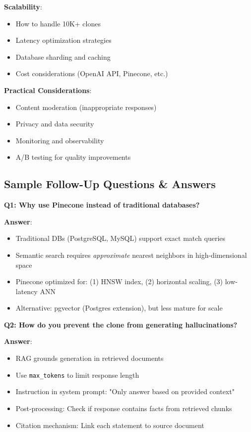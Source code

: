 \documentclass[10pt]{article}
\begin{document}
\textbf{Scalability}:
\begin{itemize}[leftmargin=*]
    \item How to handle 10K+ clones
    \item Latency optimization strategies
    \item Database sharding and caching
    \item Cost considerations (OpenAI API, Pinecone, etc.)
\end{itemize}

\textbf{Practical Considerations}:
\begin{itemize}[leftmargin=*]
    \item Content moderation (inappropriate responses)
    \item Privacy and data security
    \item Monitoring and observability
    \item A/B testing for quality improvements
\end{itemize}

\subsection{Sample Follow-Up Questions \& Answers}

\textbf{Q1: Why use Pinecone instead of traditional databases?}

\textbf{Answer}:
\begin{itemize}[leftmargin=*]
    \item Traditional DBs (PostgreSQL, MySQL) support exact match queries
    \item Semantic search requires \textit{approximate} nearest neighbors in high-dimensional space
    \item Pinecone optimized for: (1) HNSW index, (2) horizontal scaling, (3) low-latency ANN
    \item Alternative: pgvector (Postgres extension), but less mature for scale
\end{itemize}

\textbf{Q2: How do you prevent the clone from generating hallucinations?}

\textbf{Answer}:
\begin{itemize}[leftmargin=*]
    \item RAG grounds generation in retrieved documents
    \item Use \texttt{max\_tokens} to limit response length
    \item Instruction in system prompt: "Only answer based on provided context"
    \item Post-processing: Check if response contains facts from retrieved chunks
    \item Citation mechanism: Link each statement to source document
\end{itemize}
\end{document}

